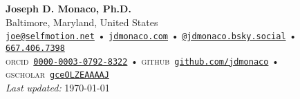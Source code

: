 
\begin{center}
  \textbf{\LARGE\color{hopkinsblue} Joseph D. Monaco, Ph.D.} \\[0.1in]
  Baltimore, Maryland, United States \\[2mm]
  \small
  \href{mailto:joe@selfmotion.net}{\color{hopkinsblue}\texttt{joe@selfmotion.net}} • 
  \href{https://jdmonaco.com/}{\color{hopkinsblue}\texttt{jdmonaco.com}} •   
  \href{https://jdmonaco.bsky.social/}{\color{hopkinsblue}\texttt{@jdmonaco.bsky.social}} •
  \href{tel:16674067398}{\color{hopkinsblue}\texttt{667.406.7398}} \\  
  \textsc{orcid}~\href{https://jdmonaco.com/orcid}{\color{hopkinsblue}\texttt{0000-0003-0792-8322}} • 
  \textsc{github}~\href{https://jdmonaco.com/github}{\color{hopkinsblue}\texttt{github.com/jdmonaco}} • 
  \textsc{gscholar}~\href{https://jdmonaco.com/google-scholar}{\color{hopkinsblue}\texttt{gceOLZEAAAAJ}} \\
  {\tiny \emph{Last updated:} \today}
\end{center}



